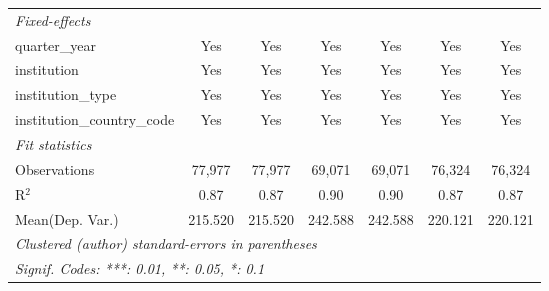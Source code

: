 \begin{tabular}{lcccccc}
   \midrule
   \emph{Fixed-effects}\\
   quarter\_year                      & Yes         & Yes      & Yes         & Yes     & Yes         & Yes\\  
   institution                        & Yes         & Yes      & Yes         & Yes     & Yes         & Yes\\  
   institution\_type                  & Yes         & Yes      & Yes         & Yes     & Yes         & Yes\\  
   institution\_country\_code         & Yes         & Yes      & Yes         & Yes     & Yes         & Yes\\  
   \midrule
   \emph{Fit statistics}\\
   Observations                       & 77,977      & 77,977   & 69,071      & 69,071  & 76,324      & 76,324\\  
   R$^2$                              & 0.87        & 0.87     & 0.90        & 0.90    & 0.87        & 0.87\\  
Mean(Dep. Var.) & 215.520 & 215.520 & 242.588 & 242.588 & 220.121 & 220.121 \\
   \midrule \midrule
   \multicolumn{7}{l}{\emph{Clustered (author) standard-errors in parentheses}}\\
   \multicolumn{7}{l}{\emph{Signif. Codes: ***: 0.01, **: 0.05, *: 0.1}}\\
\end{tabular}
\par\endgroup
